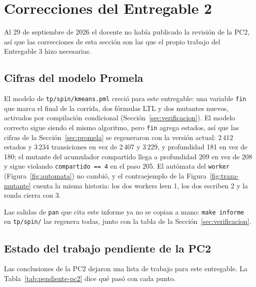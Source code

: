 \section{Correcciones del Entregable 2}\label{sec:correcciones-pc2}

Al 29 de septiembre de 2026 el docente no había publicado la revisión de la PC2, así que las
correcciones de esta sección son las que el propio trabajo del Entregable 3 hizo necesarias.

\subsection{Cifras del modelo Promela}

El modelo de \texttt{tp/spin/kmeans.pml} creció para este entregable: una variable \texttt{fin} que
marca el final de la corrida, dos fórmulas LTL y dos mutantes nuevos, activados por compilación
condicional (Sección~\ref{sec:verificacion}). El modelo correcto sigue siendo el mismo algoritmo,
pero \texttt{fin} agrega estados, así que las cifras de la Sección~\ref{sec:promela} se regeneraron
con la versión actual: 2\,412 estados y 3\,234 transiciones en vez de 2\,407 y 3\,229, y
profundidad 181 en vez de 180; el mutante del acumulador compartido llega a profundidad 209 en vez
de 208 y sigue violando \texttt{compartido == 4} en el paso 205. El autómata del \texttt{worker}
(Figura~\ref{fig:automata}) no cambió, y el contraejemplo de la Figura~\ref{fig:traza-mutante}
cuenta la misma historia: los dos workers leen 1, los dos escriben 2 y la ronda cierra con 3.

Las salidas de \texttt{pan} que cita este informe ya no se copian a mano: \texttt{make informe} en
\texttt{tp/spin/} las regenera todas, junto con la tabla de la Sección~\ref{sec:verificacion}.

\subsection{Estado del trabajo pendiente de la PC2}

Las conclusiones de la PC2 dejaron una lista de trabajo para este entregable. La
Tabla~\ref{tab:pendiente-pc2} dice qué pasó con cada punto.

